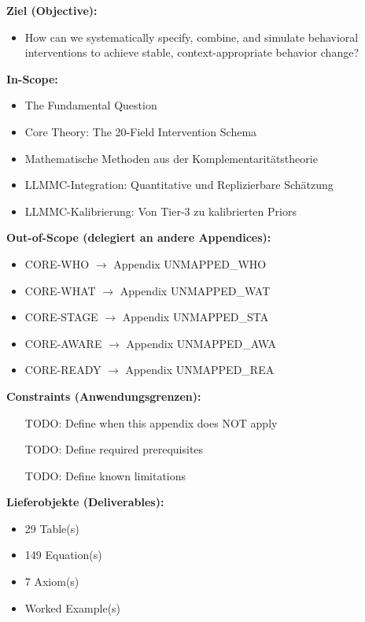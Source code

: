 \begin{tcolorbox}[
    colback=orange!5!white,
    colframe=orange!75!black,
    title={\textbf{Appendix Scope: Ziel / In-Scope / Out-of-Scope / Constraints}},
    fonttitle=\bfseries
]

\textbf{Ziel (Objective):}
\begin{itemize}[nosep]
    \item How can we systematically specify, combine, and simulate behavioral interventions to achieve stable, context-appropriate behavior change?
\end{itemize}

\textbf{In-Scope:}
\begin{itemize}[nosep]
    \item The Fundamental Question
    \item Core Theory: The 20-Field Intervention Schema
    \item Mathematische Methoden aus der Komplementaritätstheorie
    \item LLMMC-Integration: Quantitative und Replizierbare Schätzung
    \item LLMMC-Kalibrierung: Von Tier-3 zu kalibrierten Priors
\end{itemize}

\textbf{Out-of-Scope (delegiert an andere Appendices):}
\begin{itemize}[nosep]
    \item CORE-WHO $\rightarrow$ Appendix UNMAPPED_WHO
    \item CORE-WHAT $\rightarrow$ Appendix UNMAPPED_WAT
    \item CORE-STAGE $\rightarrow$ Appendix UNMAPPED_STA
    \item CORE-AWARE $\rightarrow$ Appendix UNMAPPED_AWA
    \item CORE-READY $\rightarrow$ Appendix UNMAPPED_REA
\end{itemize}

\textbf{Constraints (Anwendungsgrenzen):}
\begin{itemize}[nosep]
    \item [TODO: Define when this appendix does NOT apply]
    \item [TODO: Define required prerequisites]
    \item [TODO: Define known limitations]
\end{itemize}

\textbf{Lieferobjekte (Deliverables):}
\begin{itemize}[nosep]
    \item 29 Table(s)
    \item 149 Equation(s)
    \item 7 Axiom(s)
    \item Worked Example(s)
\end{itemize}

\end{tcolorbox}


